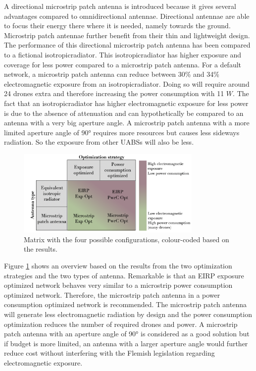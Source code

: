 A directional microstrip patch antenna is introduced because it gives several advantages compared to omnidirectional antennae.
Directional antennae are able to focus their energy there where it is needed, namely towards the ground. Microstrip patch antennae 
further benefit from their thin and lightweight design. The performance 
of this directional microstrip patch antenna has been compared to a 
fictional \gls{isotropicradiator}.
This \gls{isotropicradiator} has higher exposure and coverage for less power compared to a microstrip patch antenna.
For a default network, a microstrip patch antenna can reduce between 30\% and 34\% electromagnetic exposure 
from an \gls{isotropicradiator}. Doing so will require around 24 drones extra and therefore increasing the power consumption with 11 $W$.
The fact that an \gls{isotropicradiator} has higher electromagnetic exposure for less power  is due to the absence of 
attenuation and can hypothetically be compared to an antenna with a very big aperture angle.
A microstrip patch antenna with a more limited aperture angle of \ang{90} requires more resources but 
causes less sideways radiation. So the exposure from other \gls{UABS}s will also be less.

\begin{figure}[hb!]
\centering
  \includegraphics[width=0.8\textwidth]{../images/fourCasesMatrixSol.png}
  \caption{Matrix with the four possible configurations, colour-coded based on the results.}
  \label{fig:resultIllustration}
\end{figure}

Figure \ref{fig:resultIllustration} shows an overview based on the results from the two optimization strategies and the two types of antenna.
Remarkable is that an \gls{EIRP} exposure optimized network behaves very similar to a microstrip power consumption optimized network.
Therefore, the microstrip patch antenna in a power consumption optimized network is recommended. 
The microstrip patch antenna will generate less electromagnetic radiation by design and
 the power consumption optimization reduces the number of required drones and power. A microstrip patch antenna with an aperture 
 angle of \ang{90} is considered as a good solution but if budget is more limited, an antenna with a larger aperture angle 
 would further reduce cost without interfering with the Flemish legislation regarding electromagnetic exposure.


